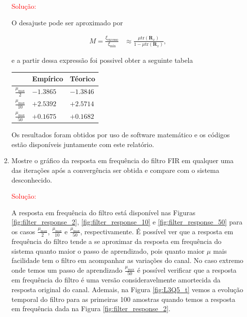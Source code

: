 \begin{enumerate}
        \textcolor{red}{Solução:}

        O desajuste pode ser aproximado por

        \begin{align}
            M = \frac{\xi_{\text{excesso}}}{\xi_{\text{min}}} &\approx \frac{\mu \text{tr}(\mathbf{R}_{x})}{1 - \mu \text{tr}(\mathbf{R}_{x})},
        \end{align}

        e a partir dessa expressão foi possivel obter a seguinte tabela

        \begin{table}[!htp]
            \centering
            \begin{tabular}{|l|l|l|}
                \hline
                & Empírico & Téorico \\ \hline
                $\frac{\mu_{\text{max}}}{2}$  & $ -1.3865 $ &  $ -1.3846 $ \\ \hline
                $\frac{\mu_{\text{max}}}{10}$ & $ +2.5392 $ & $ +2.5714 $ \\ \hline
                $\frac{\mu_{\text{max}}}{50}$ & $ +0.1675 $ & $ +0.1682 $ \\ \hline
            \end{tabular}
        \end{table}

        Os resultados foram obtidos por uso de software matemático e os códigos estão disponíveis juntamente com este relatório.

    \item Mostre o gráﬁco da resposta em frequência do ﬁltro FIR em qualquer uma das iterações após a convergência ser obtida e compare com o sistema desconhecido.

        \textcolor{red}{Solução:}

        A resposta em frequência do filtro está disponível nas Figuras \ref{fig:filter_response_2}, \ref{fig:filter_response_10} e \ref{fig:filter_response_50} para os casos $\frac{\mu_{\text{max}}}{2}$, $\frac{\mu_{\text{max}}}{10}$ e $\frac{\mu_{\text{max}}}{50}$, respectivamente. 
        É possível ver que a resposta em frequência do filtro tende a se aproximar da resposta em frequência do sistema quanto maior o passo de aprendizado, pois quanto maior $\mu$ mais facilidade tem o filtro em acompanhar as variações do canal. 
        No caso extremo onde temos um passo de aprendizado $\frac{\mu_{\text{max}}}{50}$ é possível verificar que a resposta em frequência do filtro é uma versão consideravelmente amortecida da resposta original do canal. 
        Ademais, na Figura \ref{fig:L3Q5_t} vemos a evolução temporal do filtro para as primeiras 100 amostras quando temos a resposta em frequência dada na Figura \ref{fig:filter_response_2}.

\end{enumerate}



